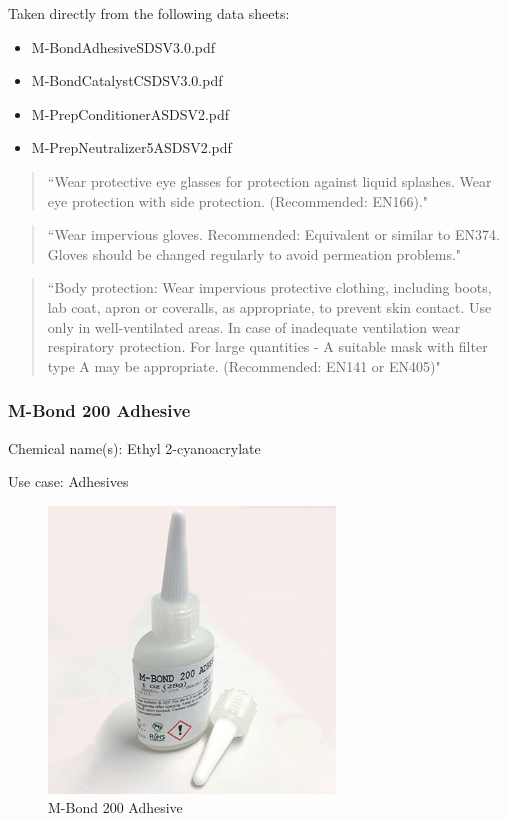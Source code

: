 Taken directly from the following data sheets: 
\begin{itemize}
    \item M-Bond\textunderscore Adhesive\textunderscore SDS\textunderscore V3.0.pdf
    \item M-Bond\textunderscore Catalyst\textunderscore C\textunderscore SDS\textunderscore V3.0.pdf
    \item M-Prep\textunderscore Conditioner\textunderscore A\textunderscore SDS\textunderscore V2.pdf
    \item M-Prep\textunderscore Neutralizer\textunderscore 5A\textunderscore SDS\textunderscore V2.pdf
\end{itemize}
\begin{quote} 
``Wear protective eye glasses for protection against liquid splashes. Wear eye protection with side protection. (Recommended: EN166)."
\end{quote}
\begin{quote} 
``Wear impervious gloves. Recommended: Equivalent or similar to EN374.
Gloves should be changed regularly to avoid permeation problems."
\end{quote}
\begin{quote} 
``Body protection:
Wear impervious protective clothing, including boots, lab coat, apron or coveralls,
as appropriate, to prevent skin contact.
Use only in well-ventilated areas. In case of inadequate ventilation wear respiratory protection.
For large quantities - A suitable mask with filter type A may be appropriate.
(Recommended: EN141 or EN405)"
\end{quote}

\subsubsection{M-Bond 200 Adhesive}
Chemical name(s): Ethyl 2-cyanoacrylate
\vspace{1em}

Use case: Adhesives
\begin{figure}[H]
        \centering
        \includegraphics[width=3in]{images/Strain Gauge/M-Bond 200 Adhesive.png}
        \caption{M-Bond 200 Adhesive}
        \label{fig:M-Bond 200 Adhesive}
\end{figure}

